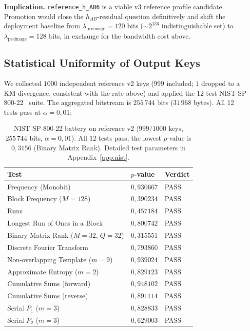 \documentclass[11pt,a4paper]{article}
\begin{document}
\textbf{Implication.} \texttt{reference\_h\_AB6} is a viable v3 reference profile candidate. Promotion would close the $h_{AB}$-residual question definitively and shift the deployment baseline from $\lambda_\text{preimage} = 120$ bits ($\sim 2^{136}$ indistinguishable set) to $\lambda_\text{preimage} = 128$ bits, in exchange for the bandwidth cost above.

\subsection{Statistical Uniformity of Output Keys}\label{sec:empirical-nist}

We collected $1000$ independent reference v2 keys ($999$ included; $1$ dropped to a KM divergence, consistent with the rate above) and applied the 12-test NIST SP 800-22~\cite{NIST800-22} suite. The aggregated bitstream is $255\,744$ bits ($31\,968$ bytes). All 12 tests pass at $\alpha = 0{,}01$:

\begin{table}[ht]
\centering
\small
\begin{tabular}{lll}
\toprule
Test & $p$-value & Verdict \\
\midrule
Frequency (Monobit) & $0{,}930667$ & PASS \\
Block Frequency ($M = 128$) & $0{,}390234$ & PASS \\
Runs & $0{,}457184$ & PASS \\
Longest Run of Ones in a Block & $0{,}800742$ & PASS \\
Binary Matrix Rank ($M = 32$, $Q = 32$) & $0{,}315551$ & PASS \\
Discrete Fourier Transform & $0{,}793860$ & PASS \\
Non-overlapping Template ($m = 9$) & $0{,}939024$ & PASS \\
Approximate Entropy ($m = 2$) & $0{,}829123$ & PASS \\
Cumulative Sums (forward) & $0{,}948102$ & PASS \\
Cumulative Sums (reverse) & $0{,}891414$ & PASS \\
Serial $P_1$ ($m = 3$) & $0{,}828833$ & PASS \\
Serial $P_2$ ($m = 3$) & $0{,}629003$ & PASS \\
\bottomrule
\end{tabular}
\caption{NIST SP 800-22 battery on reference v2 ($999/1000$ keys, $255\,744$ bits, $\alpha = 0{,}01$). All 12 tests pass; the lowest $p$-value is $0{,}3156$ (Binary Matrix Rank). Detailed test parameters in Appendix~\ref{app:nist}.}
\label{tab:nist-v2}
\end{table}
\end{document}
